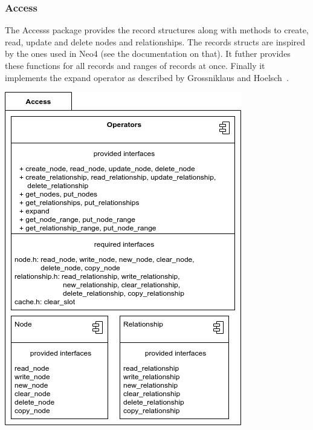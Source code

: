     \subsubsection{Access}
        The Accesss package provides the record structures along with methods to create, read, update and delete nodes and relationships. The records structs are inspired by the ones used in Neo4 (see the documentation on that).  It futher provides these functions for all records and ranges of records at once. Finally it implements the expand operator as described by Grossniklaus and Hoelsch~\autocite{Holsch2016Algeb}.

        \begin{center}
         \includegraphics[keepaspectratio, width=\textwidth, height=0.5\textheight]{img/access_arch.png} \\
        \end{center}

